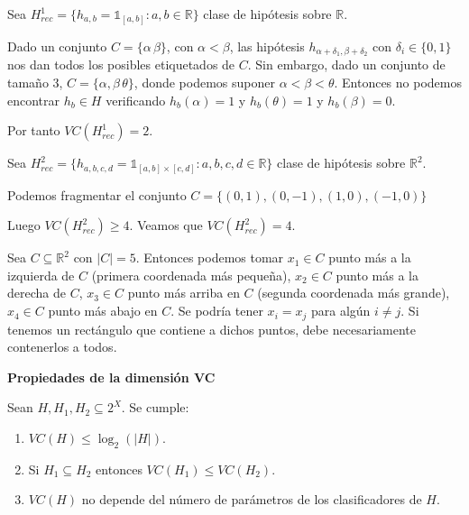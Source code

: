 \begin{example}

Sea $H^1_{rec} = \{h_{a,b} = \mathds{1}_{[a,b]}: a,b\in \mathbb{R}\}$ clase de hipótesis sobre $\mathbb{R}$. 

Dado un conjunto $C=\{\alpha\, \beta\}$, con $\alpha < \beta$, las hipótesis $h_{\alpha+\delta_1, \beta + \delta_2}$ con 
$\delta_i \in \{0,1\}$ nos dan todos los posibles etiquetados de $C$. Sin embargo, dado un conjunto de tamaño 3, 
$C=\{\alpha, \beta\, \theta\}$, donde podemos suponer $\alpha < \beta < \theta$. Entonces no podemos encontrar $h_b \in H$ 
verificando $h_b(\alpha)=1$ y $h_b(\theta) = 1$ y $h_b(\beta) = 0$.

Por tanto $VC(H^1_{rec}) = 2$.
\end{example}

\begin{example}

Sea $H^2_{rec} = \{h_{a,b,c,d} = \mathds{1}_{[a,b]\times [c,d]}: a,b,c,d\in \mathbb{R}\}$ clase de hipótesis sobre 
$\mathbb{R}^2$.

Podemos fragmentar el conjunto $C = \{(0,1), (0,-1), (1,0), (-1,0)\}$


Luego $VC(H^2_{rec}) \ge 4$. Veamos que $VC(H^2_{rec}) = 4$.

Sea $C\subseteq \mathbb{R}^2$ con $|C|=5$. Entonces podemos 
tomar $x_1 \in C$ punto más a la izquierda de $C$ (primera coordenada más pequeña), $x_2 \in C$ punto más a la derecha de 
$C$, $x_3 \in C$ punto más arriba en $C$ (segunda coordenada más grande), $x_4 \in C$ punto más abajo en $C$. Se podría 
tener $x_i = x_j$ para algún $i\neq j$. Si tenemos un rectángulo que contiene a dichos puntos, debe necesariamente contenerlos
a todos.
\end{example}



\begin{fact} \textbf{Propiedades de la dimensión VC}

Sean $H,H_1, H_2 \subseteq 2^X$. Se cumple:

\begin{enumerate}[i]
 \item $VC(H) \le \log_2(|H|)$.
 \item Si $H_1 \subseteq H_2$ entonces $VC(H_1) \le VC(H_2)$.
 \item $VC(H)$ no depende del número de parámetros de los clasificadores de $H$.
\end{enumerate}
\label{fact:props-vc}
\end{fact}

